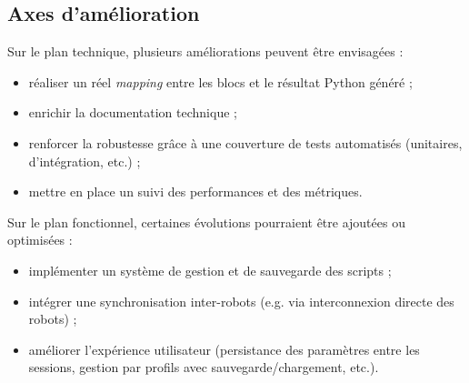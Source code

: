 \subsection{Axes d'amélioration} \label{sec:axes_amelioration}

Sur le plan technique, plusieurs améliorations peuvent être envisagées :
\begin{itemize}
    \item réaliser un réel \textit{mapping} entre les blocs et le résultat Python généré ;
    \item enrichir la documentation technique ;
    \item renforcer la robustesse grâce à une couverture de tests automatisés (unitaires, d’intégration, etc.) ;
    \item mettre en place un suivi des performances et des métriques.
\end{itemize}

Sur le plan fonctionnel, certaines évolutions pourraient être ajoutées ou optimisées :
\begin{itemize}
    \item implémenter un système de gestion et de sauvegarde des scripts ;
    \item intégrer une synchronisation inter-robots (e.g. via interconnexion directe des robots) ;
    \item améliorer l’expérience utilisateur (persistance des paramètres entre les sessions, gestion par profils avec sauvegarde/chargement, etc.).
\end{itemize}
